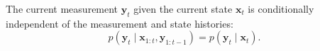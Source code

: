 \begin{property}
The current measurement $\mathbf{y}_t$ given the current state $\mathbf{x}_t$ is conditionally independent of the measurement and state histories: 
\begin{equation}\label{eq: Conditional independence of measurements}
p(\mathbf{y}_t \mid \mathbf{x}_{1:t}, \mathbf{y}_{1:t-1}) = p(\mathbf{y}_t \mid \mathbf{x}_t).    
\end{equation}
\end{property}


